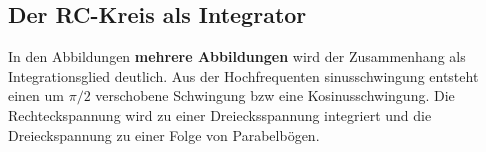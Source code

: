 \subsection{Der RC-Kreis als Integrator}
In den Abbildungen \textbf{mehrere Abbildungen} wird der Zusammenhang als Integrationsglied deutlich.
Aus der Hochfrequenten sinusschwingung entsteht einen um $\pi / 2$ verschobene Schwingung bzw eine Kosinusschwingung.
Die Rechteckspannung wird zu einer Dreiecksspannung integriert und die Dreieckspannung zu einer Folge von Parabelbögen.

\begin{figure}
    
\end{figure}